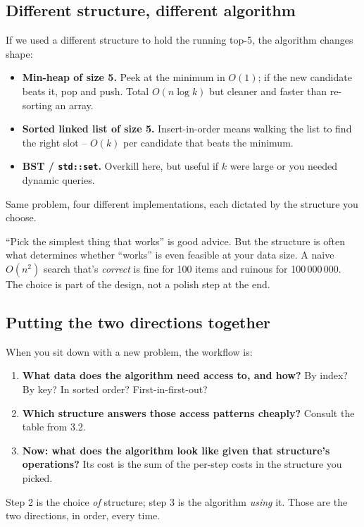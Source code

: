\documentclass[11pt]{article}
\begin{document}
\subsection*{Different structure, different algorithm}

If we used a different structure to hold the running top-5, the
algorithm changes shape:
\begin{itemize}[leftmargin=*]
  \item \textbf{Min-heap of size 5.} Peek at the minimum in $O(1)$;
        if the new candidate beats it, pop and push. Total
        $O(n \log k)$ but cleaner and faster than re-sorting an array.
  \item \textbf{Sorted linked list of size 5.} Insert-in-order means
        walking the list to find the right slot -- $O(k)$ per
        candidate that beats the minimum.
  \item \textbf{BST / \texttt{std::set}.} Overkill here, but useful if
        $k$ were large or you needed dynamic queries.
\end{itemize}

Same problem, four different implementations, each dictated by the
structure you choose.

\begin{warnbox}
``Pick the simplest thing that works'' is good advice. But the
structure is often what determines whether ``works'' is even feasible
at your data size. A naive $O(n^2)$ search that's \emph{correct} is
fine for 100 items and ruinous for 100\,000\,000. The choice is part
of the design, not a polish step at the end.
\end{warnbox}

\subsection{Putting the two directions together}

\begin{ideabox}
When you sit down with a new problem, the workflow is:
\begin{enumerate}[leftmargin=*]
  \item \textbf{What data does the algorithm need access to, and how?}
        By index? By key? In sorted order? First-in-first-out?
  \item \textbf{Which structure answers those access patterns cheaply?}
        Consult the table from 3.2.
  \item \textbf{Now: what does the algorithm look like given that
        structure's operations?} Its cost is the sum of the per-step
        costs in the structure you picked.
\end{enumerate}
Step 2 is the choice \emph{of} structure; step 3 is the algorithm
\emph{using} it. Those are the two directions, in order, every time.
\end{ideabox}
\end{document}
